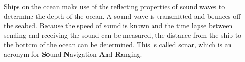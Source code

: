 \begin{minipage}{.5\textwidth}
\begin{figure}[H]
\begin{center}
\end{center}

 \end{figure}       
\end{minipage}
\begin{minipage}{.5\textwidth}
      \label{m38800*id185212}Ships on the ocean make use of the reflecting properties of sound waves to determine the depth of the ocean. A sound wave is transmitted and bounces off the seabed. Because the speed of sound is known and the time lapse between sending and receiving the sound can be measured, the distance from the ship to the bottom of the ocean can be determined, This is called sonar, which is an acronym for \textbf{So}und \textbf{N}avigation \textbf{A}nd \textbf{R}anging.\par 
      \label{m38800*uid13}
     \end{minipage}
            

